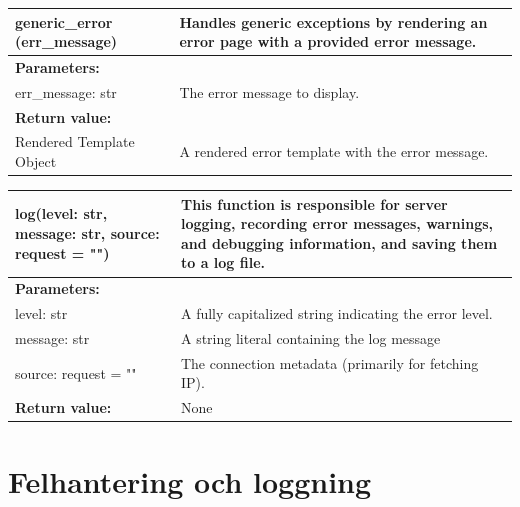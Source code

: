 \documentclass{liu_mall}
\begin{document}
    \vspace{-5mm}
    \begin{table}[!h]
        \begin{tabularx}{\textwidth}{p{4.5cm}|p{11.15cm}}\hline
            \textbf{generic\_error\newline
                (err\_message)} &   Handles generic exceptions by rendering an error page\newline
                                    with a provided error message.\\
            \hline
            \textbf{Parameters:} &\\
                err\_message: str & The error message to display.\\ 
            \hline
            \textbf{Return value:} &\\
                Rendered Template Object & A rendered error template with the error message.\\
            \hline
        \end{tabularx}
    \end{table}
    \vspace{-5mm}
    \begin{table}[!h]
        \begin{tabularx}{\textwidth}{p{4.5cm}|p{11.15cm}}
            \hline
            \textbf{log(level: str,\newline
            message: str,\newline
            source: request = "")} &
            This function is responsible for server logging, recording error messages,\newline
            warnings, and debugging information, and saving them to a log file.\\\hline
            \textbf{Parameters:}&\\
            level: str & A fully capitalized string indicating the error level.\\
            message: str & A string literal containing the log message\\
            source: request = "" & The connection metadata (primarily for fetching IP).\\\hline
            \textbf{Return value:} & None\\
            \hline
        \end{tabularx}
        \label{table:log()}
    \end{table}
    
    \newpage
    \section{Felhantering och loggning}
\end{document}
